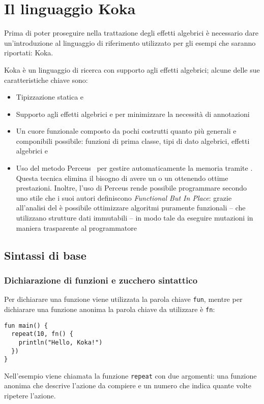 \section{Il linguaggio Koka}
Prima di poter proseguire nella trattazione degli effetti algebrici è necessario dare un'introduzione al linguaggio di riferimento utilizzato per gli esempi che saranno riportati: Koka\cite{cit:koka-lang}.

Koka è un linguaggio di ricerca con supporto agli effetti algebrici; alcune delle sue caratteristiche chiave sono:
\begin{itemize}
  \item Tipizzazione statica e 
  \item Supporto agli effetti algebrici e  per minimizzare la necessità di annotazioni
  \item Un cuore funzionale composto da pochi costrutti quanto più generali e componibili possibile: funzioni di prima classe, tipi di dato algebrici, effetti algebrici e 
  \item Uso del metodo Perceus~\cite{cit:perceus-garbage-free-reference-counting-with-reuse} per gestire automaticamente la memoria tramite . Questa tecnica elimina il bisogno di avere un  o un  ottenendo ottime prestazioni. Inoltre, l'uso di Perceus rende possibile programmare secondo uno stile che i suoi autori definiscono \emph{Functional But In Place}: grazie all'analisi del  è possibile ottimizzare algoritmi puramente funzionali -- che utilizzano strutture dati immutabili -- in modo tale da eseguire mutazioni  in maniera trasparente al programmatore~\cite{cit:koka-benchmarks}
\end{itemize}

\subsection{Sintassi di base}
\subsubsection{Dichiarazione di funzioni e zucchero sintattico}
Per dichiarare una funzione viene utilizzata la parola chiave \lstinline{fun}, mentre per dichiarare una funzione anonima la parola chiave da utilizzare è \lstinline{fn}:
\begin{lstlisting}[language=koka]
fun main() {
  repeat(10, fn() {
    println("Hello, Koka!")
  })
}
\end{lstlisting}
Nell'esempio viene chiamata la funzione \lstinline{repeat} con due argomenti: una funzione anonima che descrive l'azione da compiere e un numero che indica quante volte ripetere l'azione.

